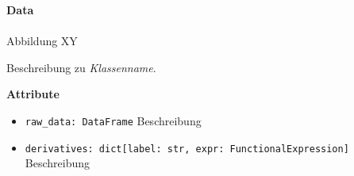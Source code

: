 \documentclass{article}
\begin{document}
\newpage
\textbf{\large{Data}}\\\\
Abbildung XY

Beschreibung zu \textit{Klassenname}.
\newline \newline

\textbf{{Attribute}}
\begin{itemize}
\item \texttt{raw_data: DataFrame} \newline Beschreibung
\item \texttt{derivatives: dict[label: str, expr: FunctionalExpression]} \newline Beschreibung
\\\\
\end{itemize}
\end{document}
